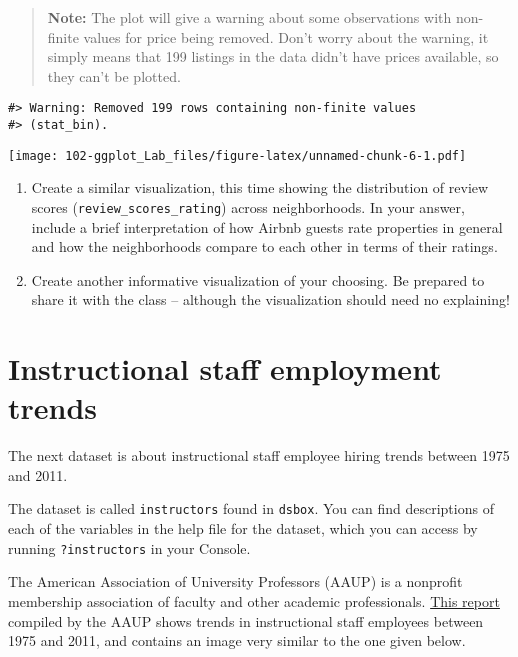 \documentclass[
]{book}
\begin{document}
\begin{quote}
\textbf{Note:} The plot will give a warning about some observations with non-finite values for price being removed. Don't worry about the warning, it simply means that 199 listings in the data didn't have prices available, so they can't be plotted.
\end{quote}

\begin{verbatim}
#> Warning: Removed 199 rows containing non-finite values
#> (stat_bin).
\end{verbatim}

\texttt{[image: 102-ggplot\_Lab\_files/figure-latex/unnamed-chunk-6-1.pdf]}

\begin{enumerate}
\def\labelenumi{\arabic{enumi}.}
\setcounter{enumi}{5}
\item
  Create a similar visualization, this time showing the distribution of review scores (\texttt{review\_scores\_rating}) across neighborhoods. In your answer, include a brief interpretation of how Airbnb guests rate properties in general and how the neighborhoods compare to each other in terms of their ratings.
\item
  Create another informative visualization of your choosing. Be prepared to share it with the class -- although the visualization should need no explaining!
\end{enumerate}

\hypertarget{instructional-staff-employment-trends}{%
\section{Instructional staff employment trends}\label{instructional-staff-employment-trends}}

The next dataset is about instructional staff employee hiring trends between 1975 and 2011.

The dataset is called \texttt{instructors} found in \texttt{dsbox}. You can find descriptions of each of the variables in the help file for the dataset, which you can access by running \texttt{?instructors} in your Console.

The American Association of University Professors (AAUP) is a nonprofit membership association of faculty and other academic professionals. \href{https://www.aaup.org/sites/default/files/files/AAUP_Report_InstrStaff-75-11_apr2013.pdf}{This report} compiled by the AAUP shows trends in instructional staff employees between 1975 and 2011, and contains an image very similar to the one given below.
\end{document}

